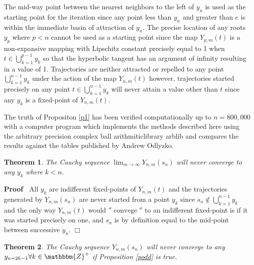 \documentclass{article}
\newcommand{\nin}{\not\in}
\newcommand{\tmop}[1]{\ensuremath{\operatorname{#1}}}
\newenvironment{proof}{\noindent\textbf{Proof\ }}{\hspace*{\fill}$\Box$\medskip}
\newtheorem{theorem}{Theorem}
\begin{document}
\begin{remark}
  The mid-way point between the nearest neighbors to the left of $y_n$ is used
  as the starting point for the iteration since any point less than $y_n$ and
  greater than $e$ is within the immediate basin of attraction of $y_n$. The
  precise location of any roots $y_p$ where $p < n$ cannot be used as a
  starting point since the map $Y_{p, m} (t)$ is a non-expansive mapping with
  Lipschitz constant precisely equal to 1 when $t \in \bigcup^{p - 1}_{k = 1}
  y_k$ so that the hyperbolic tangent has an argument of infinity resulting in
  a value of 1. Trajectories are neither attracted or repelled to any point
  $\bigcup^{n - 1}_{k = 1} y_k$ under the action of the map $Y_{n, m} (t)$
  however, trajectories started precisely on any point $t \in \bigcup^{n -
  1}_{k = 1} y_k$ will never attain a value other than $t$ since any $y_k$ is
  a fixed-point of $Y_{n, m} (t)$. 
\end{remark}

\begin{note}
  The truth of Propositon \ref{p1} has been verified computationally up to $n
  = 800, 000$ with a computer program which implements the methods described
  here using the arbitrary precision complex ball arithmiticlibrary
  arblib{\cite{Johansson2013arb}} and compares the results against the tables
  published by Andrew Odlyzko{\cite{zt}}. 
\end{note}

\begin{theorem}
  The Cauchy sequence $\lim_{m \rightarrow \infty} Y_{n, m} (s_n)$ will never
  converge to any $y_k$ where $k < n$. 
\end{theorem}

\begin{proof}
  All $y_k$ are indifferent fixed-points of $Y_{n, m} (t)$ and the
  trajectories generated by $Y_{n, m} (s_n)$ are never started from a point
  $y_k$ since $s_n \nin \bigcup_{k = 1}^{n - 1} y_k$ and the only way $Y_{n,
  m} (t)$ would $'' \tmop{convege}''$ to an indifferent fixed-point is if it
  was started precisely on one, and $s_n$ is by definition equal to the
  mid-point between successive $y_n$.
\end{proof}

\begin{theorem}
  \label{pc}The Cauchy sequence $Y_{n, m} (s_n)$ will never converge to any
  $y_{n + 2 k - 1} \forall k \in \mathbbm{Z}^+$ if Proposition \ref{podd} is
  true.
\end{theorem}
\end{document}
